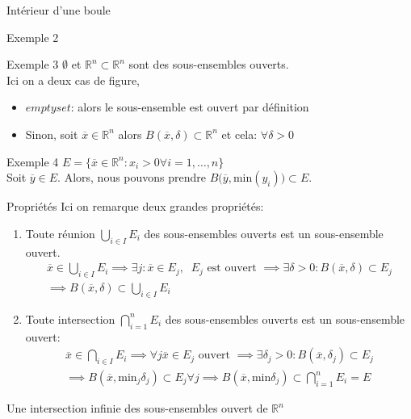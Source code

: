 \begin{parag}{Intérieur d'une boule}
\begin{subparag}{Exemple 2}
       
   \end{subparag}
   \begin{subparag}{Exemple 3}
       $\emptyset$ et $ \mathbb{R}^n  \subset \mathbb{R}^n $ sont des sous-ensembles ouverts.      \\
       Ici on a deux cas de figure, 
       \begin{itemize}
           \item $ emptyset$: alors le sous-ensemble est ouvert par définition
           \item Sinon, soit $ \overline{x} \in \mathbb{R}^n $ alors $B( \overline{x}, \delta) \subset \mathbb{R}^n $ et cela: $ \forall \delta > 0$
       \end{itemize}
   \end{subparag}
   \begin{subparag}{Exemple 4}
       $E = \{ \overline{x} \in \mathbb{R}^n: x_i > 0 \forall i = 1, \dots, n\}$\\
       Soit $ \overline{y} \in E$. Alors, nous pouvons prendre $B( \overline{y}, $min$(y_i)) \subset E$.
   \end{subparag}
\end{parag}

\begin{parag}{Propriétés}
    Ici on remarque deux grandes propriétés:
    \begin{enumerate}
       \item Toute réunion $\bigcup_{i \in I} E_i$ des sous-ensembles ouverts est un sous-ensemble ouvert.
           \begin{align*}
               \overline{x} \in \bigcup_{i \in I} E_i \implies \exists j: \overline{x} \in E_j, \; \; E_j \text{ est ouvert } \implies \exists \delta > 0: B( \overline{x}, \delta) \subset E_j \\
               \implies B( \overline{x}, \delta) \subset \bigcup_{i \in I}E_i
           \end{align*}
           

       \item Toute intersection  $ \bigcap_{i=1}^nE_i$ des sous-ensembles ouverts est un sous-ensemble ouvert:
            \begin{align*}
               \overline{x} \in  \bigcap_{i\in I}E_i \implies \forall j \overline{x} \in E_j \text{ ouvert } \implies \exists \delta_j > 0 : B( \overline{x}, \delta_j) \subset E_j \\
               \implies B( \overline{x}, \text{min}_j \delta_j) \subset E_j \forall j \implies B( \overline{x}, \text{min} \delta_j) \subset \bigcap_{i=1}^n E_i = E
           \end{align*}
        
    \end{enumerate}
    \begin{framedremark}
        Une intersection infinie des sous-ensembles ouvert de $ \mathbb{R}^n $
    \end{framedremark}
    
\end{parag}



